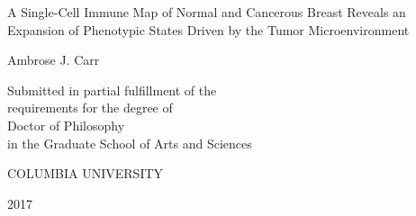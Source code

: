 
\thispagestyle{empty} %
\begin{center}
  \SingleSpace

  \vspace*{1in}

  A Single-Cell Immune Map of Normal and Cancerous Breast Reveals an Expansion of Phenotypic States Driven by the Tumor Microenvironment 

  \bigskip %

  Ambrose J. Carr

  \vspace{5in}

  Submitted in partial fulfillment of the\\
  requirements for the degree of\\
  Doctor of Philosophy\\
  in the Graduate School of Arts and Sciences\\

  \bigskip
  \bigskip

  COLUMBIA UNIVERSITY

  \bigskip %

  2017
\end{center}
